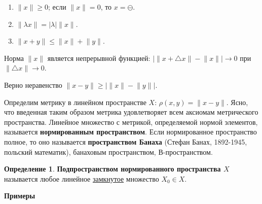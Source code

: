 \documentclass[12pt,a4paper,titlepage, oneside]{book}
\theoremstyle{definition}
\newtheorem*{definition}{Определение}
\theoremstyle{plain}
\theoremstyle{remark}
\theoremstyle{remark}
\theoremstyle{remark}
\theoremstyle{plain}
\theoremstyle{plain}
\begin{document}
\begin{enumerate}

	\item $\lVert x\rVert \geq 0$; если $\lVert x\rVert = 0$, то $x=\ominus$.

	\item $\lVert \lambda x \rVert = \lvert \lambda \rvert \lVert x \rVert$.

	\item $\lVert x+y \rVert\leq\lVert x \rVert + \lVert y \rVert$.

\end{enumerate}

Норма $\lVert x\rVert$ является непрерывной функцией: $\lvert\lVert x+\triangle x\rVert-\lVert x\rVert\rvert\to0$ при $\lVert\triangle x\rVert\to0$.

Верно неравенство $\lVert x-y\rVert\geq\lvert\lVert x\rVert-\lVert y\rVert\rvert$.

Определим метрику в линейном пространстве $X$: $\rho(x,y)=\lVert x-y\rVert$. Ясно, что введенная таким образом метрика удовлетворяет всем аксиомам метрического пространства. Линейное множество с метрикой, определяемой нормой элементов, называется \textbf{нормированным пространством}. Если нормированное пространство полное, то оно называется \textbf{пространством Банаха} (Стефан Банах, 1892-1945, польский математик), банаховым пространством, В-пространством.

\begin{definition}
\textbf{Подпространством нормированного пространства $X$} называется любое линейное \underline{замкнутое} множество $X_0 \in X$.
\end{definition}

\textbf{Примеры}
\end{document}
